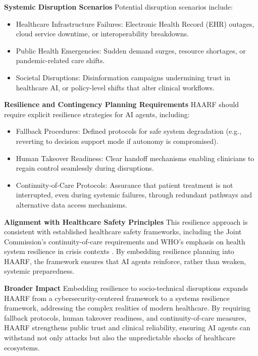 \documentclass[11pt]{article}
\begin{document}
\textbf{Systemic Disruption Scenarios}  
Potential disruption scenarios include:
\begin{itemize}
    \item Healthcare Infrastructure Failures: Electronic Health Record (EHR) outages, cloud service downtime, or interoperability breakdowns.
    \item Public Health Emergencies: Sudden demand surges, resource shortages, or pandemic-related care shifts.
    \item Societal Disruptions: Disinformation campaigns undermining trust in healthcare AI, or policy-level shifts that alter clinical workflows.
\end{itemize}

\textbf{Resilience and Contingency Planning Requirements}  
HAARF should require explicit resilience strategies for AI agents, including:
\begin{itemize}
    \item Fallback Procedures: Defined protocols for safe system degradation (e.g., reverting to decision support mode if autonomy is compromised).
    \item Human Takeover Readiness: Clear handoff mechanisms enabling clinicians to regain control seamlessly during disruptions.
    \item Continuity-of-Care Protocols: Assurance that patient treatment is not interrupted, even during systemic failures, through redundant pathways and alternative data access mechanisms.
\end{itemize}

\textbf{Alignment with Healthcare Safety Principles}  
This resilience approach is consistent with established healthcare safety frameworks, including the Joint Commission’s continuity-of-care requirements and WHO’s emphasis on health system resilience in crisis contexts \cite{who2020resilience}. By embedding resilience planning into HAARF, the framework ensures that AI agents reinforce, rather than weaken, systemic preparedness.

\textbf{Broader Impact}  
Embedding resilience to socio-technical disruptions expands HAARF from a cybersecurity-centered framework to a systems resilience framework, addressing the complex realities of modern healthcare. By requiring fallback protocols, human takeover readiness, and continuity-of-care measures, HAARF strengthens public trust and clinical reliability, ensuring AI agents can withstand not only attacks but also the unpredictable shocks of healthcare ecosystems.
\end{document}
